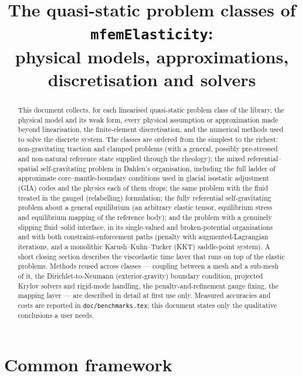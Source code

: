 \documentclass[11pt]{article}
\title{The quasi-static problem classes of \texttt{mfemElasticity}:\\
       physical models, approximations, discretisation and solvers}
\author{}
\date{}
\numberwithin{equation}{section}
\theoremstyle{remark}
\newcommand{\code}[1]{\texttt{#1}}
\begin{document}
\maketitle

\begin{abstract}
\noindent
This document collects, for each linearised quasi-static problem class of
the library, the physical model and its weak form, every physical
assumption or approximation made beyond linearisation, the finite-element
discretisation, and the numerical methods used to solve the discrete
system. The classes are ordered from the simplest to the richest:
non-gravitating traction and clamped problems (with a general, possibly
pre-stressed and non-natural reference state supplied through the
rheology); the mixed referential--spatial self-gravitating problem in
Dahlen's organisation, including the full ladder of approximate
core--mantle-boundary conditions used in glacial isostatic adjustment
(GIA) codes and the physics each of them drops; the same problem with the
fluid treated in the gauged (relabelling) formulation; the fully
referential self-gravitating problem about a general equilibrium
(an arbitrary elastic tensor, equilibrium stress and equilibrium mapping
of the reference body); and the problem with a genuinely slipping
fluid--solid interface, in its single-valued and broken-potential
organisations and with both constraint-enforcement paths
(penalty with augmented-Lagrangian iterations, and a monolithic
Karush--Kuhn--Tucker (KKT) saddle-point system). A short closing section describes the viscoelastic time layer
that runs on top of the elastic problems. Methods reused across classes
--- coupling between a mesh and a sub-mesh of it, the
Dirichlet-to-Neumann (exterior-gravity) boundary condition, projected
Krylov solvers and rigid-mode handling, the penalty-and-refinement gauge
fixing, the mapping layer --- are described in detail at first use only.
Measured accuracies and costs are reported in \code{doc/benchmarks.tex};
this document states only the qualitative conclusions a user needs.
\end{abstract}

\tableofcontents

\section{Common framework}
\label{sec:common}
\end{document}
